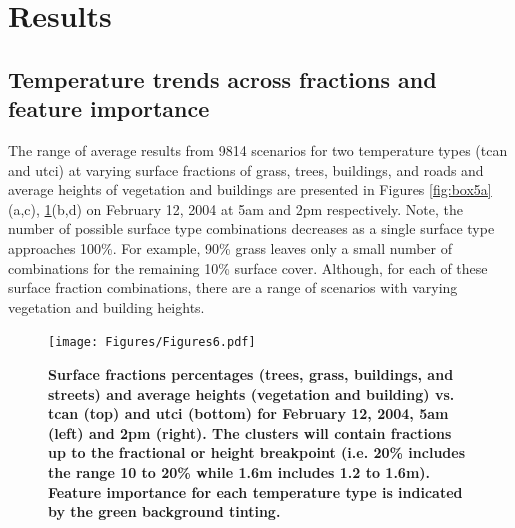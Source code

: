\documentclass[final,3p,times,authoryear]{elsarticle}
\begin{document}
\section{Results}\label{sec:results}

\subsection{Temperature trends across fractions and feature importance}\label{sec:resulttrends}


The range of average results from 9814 scenarios for two temperature types (\gls{tcan} and \gls{utci}) at varying surface fractions of grass, trees, buildings, and roads and average heights of vegetation and buildings are presented in Figures \ref{fig:box5a}(a,c), \ref{fig:box14a}(b,d) on February 12, 2004 at 5am and 2pm respectively. Note, the number of possible surface type combinations decreases as a single surface type approaches 100\%. For example, 90\% grass leaves only a small number of combinations for the remaining 10\% surface cover. Although, for each of these surface fraction combinations, there are a range of scenarios with varying vegetation and building heights.


\begin{figure}
\centering
\texttt{[image: Figures/Figures6.pdf]}
\caption{\bf Surface fractions percentages (trees, grass, buildings, and streets) and average heights (vegetation and building) vs. \gls{tcan} (top) and \gls{utci} (bottom) for February 12, 2004, 5am (left) and 2pm (right). The clusters will contain fractions up to the fractional or height breakpoint (i.e. 20\% includes the range 10 to 20\%  while 1.6m includes 1.2 to 1.6m). Feature importance for each temperature type is indicated by the green background tinting.}
 \label{fig:box5a} \label{fig:box14a}
\end{figure} 
\end{document}
